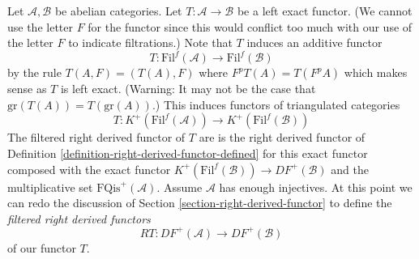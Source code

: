 \noindent
Let $\mathcal{A}, \mathcal{B}$ be abelian categories.
Let $T : \mathcal{A} \to \mathcal{B}$ be a left exact functor.
(We cannot use the letter $F$ for the functor since this would
conflict too much with our use of the letter $F$ to indicate
filtrations.) Note that $T$ induces an additive functor
$$
T : \text{Fil}^f(\mathcal{A}) \to \text{Fil}^f(\mathcal{B})
$$
by the rule $T(A, F) = (T(A), F)$ where $F^pT(A) = T(F^pA)$ which makes
sense as $T$ is left exact. (Warning: It may not be the case that
$\text{gr}(T(A)) = T(\text{gr}(A))$.)
This induces functors of triangulated categories
\begin{equation}
\label{equation-induced-T-filtered}
T :
K^{+}(\text{Fil}^f(\mathcal{A}))
\longrightarrow
K^{+}(\text{Fil}^f(\mathcal{B}))
\end{equation}
The filtered right derived functor of $T$ are is the right derived functor of
Definition \ref{definition-right-derived-functor-defined}
for this exact functor composed with the exact functor
$K^{+}(\text{Fil}^f(\mathcal{B})) \to DF^{+}(\mathcal{B})$ and the
multiplicative set $\text{FQis}^{+}(\mathcal{A})$.
Assume $\mathcal{A}$ has enough injectives. At this point we can redo the
discussion of
Section \ref{section-right-derived-functor}
to define the
{\it filtered right derived functors}
\begin{equation}
\label{equation-filtered-derived-functor}
RT : DF^{+}(\mathcal{A}) \longrightarrow DF^{+}(\mathcal{B})
\end{equation}
of our functor $T$.

